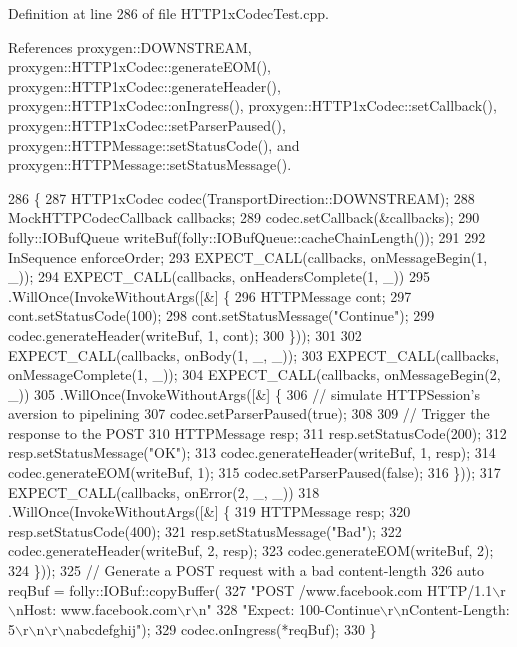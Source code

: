 Definition at line 286 of file H\+T\+T\+P1x\+Codec\+Test.\+cpp.



References proxygen\+::\+D\+O\+W\+N\+S\+T\+R\+E\+AM, proxygen\+::\+H\+T\+T\+P1x\+Codec\+::generate\+E\+O\+M(), proxygen\+::\+H\+T\+T\+P1x\+Codec\+::generate\+Header(), proxygen\+::\+H\+T\+T\+P1x\+Codec\+::on\+Ingress(), proxygen\+::\+H\+T\+T\+P1x\+Codec\+::set\+Callback(), proxygen\+::\+H\+T\+T\+P1x\+Codec\+::set\+Parser\+Paused(), proxygen\+::\+H\+T\+T\+P\+Message\+::set\+Status\+Code(), and proxygen\+::\+H\+T\+T\+P\+Message\+::set\+Status\+Message().


\begin{DoxyCode}
286                                       \{
287   HTTP1xCodec codec(TransportDirection::DOWNSTREAM);
288   MockHTTPCodecCallback callbacks;
289   codec.setCallback(&callbacks);
290   folly::IOBufQueue writeBuf(folly::IOBufQueue::cacheChainLength());
291 
292   InSequence enforceOrder;
293   EXPECT\_CALL(callbacks, onMessageBegin(1, \_));
294   EXPECT\_CALL(callbacks, onHeadersComplete(1, \_))
295     .WillOnce(InvokeWithoutArgs([&] \{
296           HTTPMessage cont;
297           cont.setStatusCode(100);
298           cont.setStatusMessage(\textcolor{stringliteral}{"Continue"});
299           codec.generateHeader(writeBuf, 1, cont);
300         \}));
301 
302   EXPECT\_CALL(callbacks, onBody(1, \_, \_));
303   EXPECT\_CALL(callbacks, onMessageComplete(1, \_));
304   EXPECT\_CALL(callbacks, onMessageBegin(2, \_))
305     .WillOnce(InvokeWithoutArgs([&] \{
306           \textcolor{comment}{// simulate HTTPSession's aversion to pipelining}
307           codec.setParserPaused(\textcolor{keyword}{true});
308 
309           \textcolor{comment}{// Trigger the response to the POST}
310           HTTPMessage resp;
311           resp.setStatusCode(200);
312           resp.setStatusMessage(\textcolor{stringliteral}{"OK"});
313           codec.generateHeader(writeBuf, 1, resp);
314           codec.generateEOM(writeBuf, 1);
315           codec.setParserPaused(\textcolor{keyword}{false});
316         \}));
317   EXPECT\_CALL(callbacks, onError(2, \_, \_))
318     .WillOnce(InvokeWithoutArgs([&] \{
319           HTTPMessage resp;
320           resp.setStatusCode(400);
321           resp.setStatusMessage(\textcolor{stringliteral}{"Bad"});
322           codec.generateHeader(writeBuf, 2, resp);
323           codec.generateEOM(writeBuf, 2);
324         \}));
325   \textcolor{comment}{// Generate a POST request with a bad content-length}
326   \textcolor{keyword}{auto} reqBuf = folly::IOBuf::copyBuffer(
327       \textcolor{stringliteral}{"POST /www.facebook.com HTTP/1.1\(\backslash\)r\(\backslash\)nHost: www.facebook.com\(\backslash\)r\(\backslash\)n"}
328       \textcolor{stringliteral}{"Expect: 100-Continue\(\backslash\)r\(\backslash\)nContent-Length: 5\(\backslash\)r\(\backslash\)n\(\backslash\)r\(\backslash\)nabcdefghij"});
329   codec.onIngress(*reqBuf);
330 \}
\end{DoxyCode}
